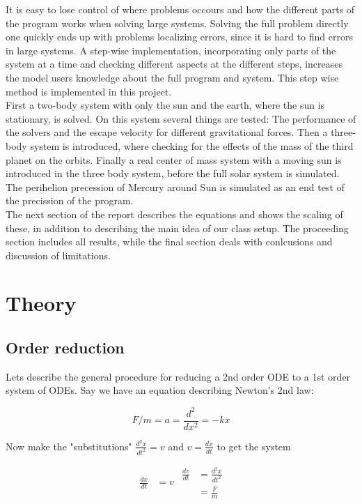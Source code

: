 \documentclass{article}
\begin{document}
It is easy to lose control of where problems occours and how the different parts of the program works when solving large systems. Solving the full problem directly one quickly ends up with problems localizing errors, since it is hard to find errors in large systems. A step-wise implementation, incorporating only parts of the system at a time and checking different aspects at the different steps, increases the model users knowledge about the full program and system. This step wise method is implemented in this project. \\

First a two-body system with only the sun and the earth, where the sun is stationary, is solved. On this system several things are tested: The performance of the solvers and the escape velocity for different gravitational forces. Then a three-body system is introduced, where checking for the effects of the mass of the third planet on the orbits. Finally a real center of mass system with a moving sun is introduced in the three body system, before the full solar system is simulated. The perihelion precession of Mercury around Sun is simulated as an end test of the precission of the program.\\

The next section of the report describes the equations and shows the scaling of these, in addition to describing the main idea of our class setup. The proceeding section includes all results, while the final section deals with conlcusions and discussion of limitations.


\section{Theory}

\subsection{Order reduction}
Lets describe the general procedure for reducing a 2nd order ODE to a 1st order system of ODEs. Say we have an equation describing Newton's 2nd law:

\begin{equation}
F/m = a = \frac{d^2}{dx^2} = -kx
\end{equation}

Now make the "substitutions" $\frac{d^2x}{dt^2} = v$ and $v = \frac{dx}{dt}$ to get the system

\begin{subequations}
	\begin{align}\label{eq:dxdt}
	\frac{dx}{dt} &= v
	\end{align}
	
	\begin{align}
	\frac{dv}{dt} &= \frac{d^2x}{dt^2}\\
	 &= \frac{F}{m}\label{eq:dvdt}
	\end{align}
\end{subequations}
\end{document}
